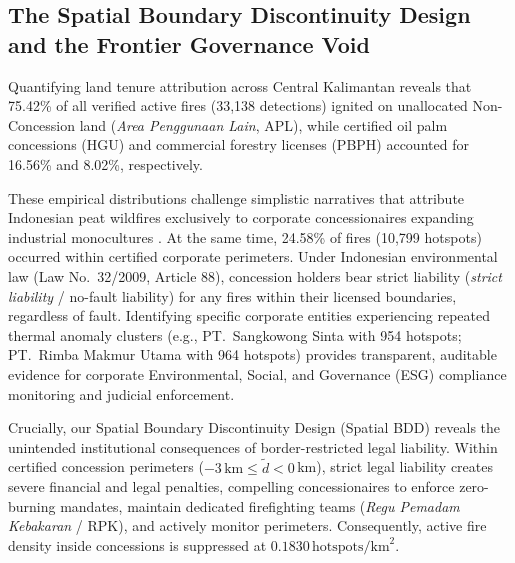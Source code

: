 \subsection{The Spatial Boundary Discontinuity Design and the Frontier Governance Void}
\label{subsec:disc_tenure}

Quantifying land tenure attribution across Central Kalimantan reveals that 75.42\% of all verified active fires (33,138 detections) ignited on unallocated Non-Concession land (\textit{Area Penggunaan Lain}, APL), while certified oil palm concessions (HGU) and commercial forestry licenses (PBPH) accounted for 16.56\% and 8.02\%, respectively.

These empirical distributions challenge simplistic narratives that attribute Indonesian peat wildfires exclusively to corporate concessionaires expanding industrial monocultures \citep{Tacconi2003CIFOR, Carlson2012PNAS}. At the same time, 24.58\% of fires (10,799 hotspots) occurred within certified corporate perimeters. Under Indonesian environmental law (Law No.~32/2009, Article 88), concession holders bear strict liability (\textit{strict liability} / no-fault liability) for any fires within their licensed boundaries, regardless of fault. Identifying specific corporate entities experiencing repeated thermal anomaly clusters (e.g., PT.~Sangkowong Sinta with 954 hotspots; PT.~Rimba Makmur Utama with 964 hotspots) provides transparent, auditable evidence for corporate Environmental, Social, and Governance (ESG) compliance monitoring and judicial enforcement.

Crucially, our Spatial Boundary Discontinuity Design (Spatial BDD) reveals the unintended institutional consequences of border-restricted legal liability. Within certified concession perimeters ($-3\,\text{km} \le \tilde{d} < 0$\,km), strict legal liability creates severe financial and legal penalties, compelling concessionaires to enforce zero-burning mandates, maintain dedicated firefighting teams (\textit{Regu Pemadam Kebakaran} / RPK), and actively monitor perimeters. Consequently, active fire density inside concessions is suppressed at $0.1830\,\text{hotspots}/\text{km}^2$. 

